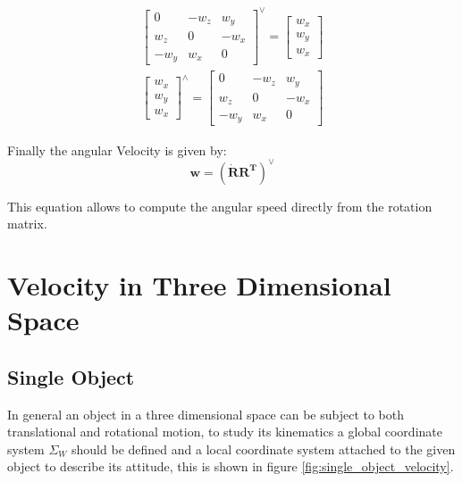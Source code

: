 \documentclass[a4paper]{report}
\begin{document}
\begin{equation}
\begin{split}
    \begin{bmatrix}
        0 & -w_z & w_y \\
        w_z & 0 & -w_x \\
        -w_y & w_x & 0
    \end{bmatrix}^{\vee} = \begin{bmatrix} w_x \\ w_y \\ w_x\end{bmatrix} \\
    \begin{bmatrix} w_x \\ w_y \\ w_x\end{bmatrix}^{\wedge} =
    \begin{bmatrix}
        0 & -w_z & w_y \\
        w_z & 0 & -w_x \\
        -w_y & w_x & 0
    \end{bmatrix}
\end{split}
\end{equation}

Finally the angular Velocity is given by:
\begin{equation}
    \boldsymbol{w} = (\boldsymbol{\dot{R}} \boldsymbol{R^{T}})^{\vee}
\end{equation}

This equation allows to compute the angular speed directly from the rotation matrix.

\section{Velocity in Three Dimensional Space}

\subsection{Single Object}
In general an object in a three dimensional space can be subject to both translational
and rotational motion, to study its kinematics a global coordinate system $\Sigma_W$
should be defined and a local coordinate system attached to the given object to
describe its attitude, this is shown in figure \ref{fig:single_object_velocity}.
\end{document}
